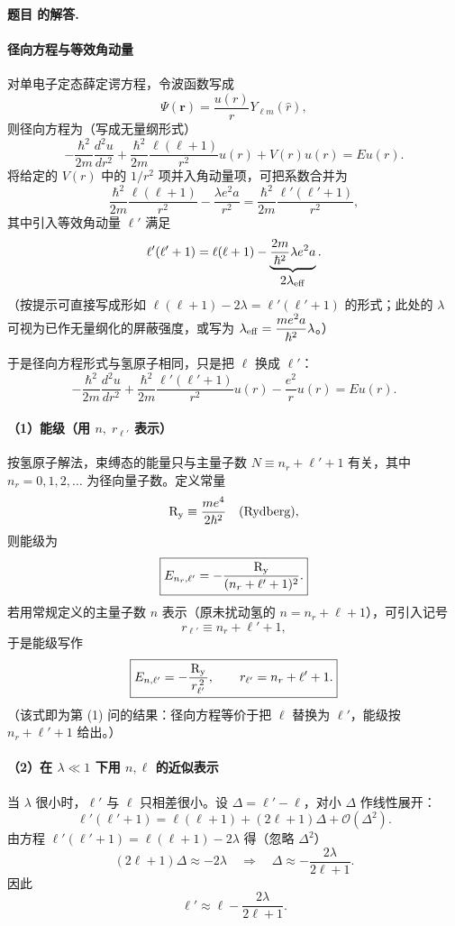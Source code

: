 \documentclass[12pt, a4paper, oneside]{ctexart}
\newcounter{problemname}
\newenvironment{solution}
  {\par\noindent\textbf{题目 \theproblemname 的解答. }}
  {\par}
\begin{document}
\begin{solution}
  \paragraph{径向方程与等效角动量}
对单电子定态薛定谔方程，令波函数写成
\[
\Psi(\mathbf r)=\frac{u(r)}{r}Y_{\ell m}(\hat r),
\]
则径向方程为（写成无量纲形式）
\[
-\frac{\hbar^2}{2m}\frac{d^2 u}{dr^2}
+\frac{\hbar^2}{2m}\frac{\ell(\ell+1)}{r^2}u(r)
+V(r)u(r)=Eu(r).
\]
将给定的 \(V(r)\) 中的 \(1/r^2\) 项并入角动量项，可把系数合并为
\[
\frac{\hbar^2}{2m}\frac{\ell(\ell+1)}{r^2}-\frac{\lambda e^2 a}{r^2}
=\frac{\hbar^2}{2m}\frac{\ell'(\ell'+1)}{r^2},
\]
其中引入等效角动量 \(\ell'\) 满足
\[
\ell'(\ell'+1)=\ell(\ell+1)-\underbrace{\frac{2m}{\hbar^2}\lambda e^2 a}_{\displaystyle 2\lambda_{\rm eff}}.
\]
（按提示可直接写成形如 \(\ell(\ell+1)-2\lambda=\ell'(\ell'+1)\) 的形式；此处的 \(\lambda\) 可视为已作无量纲化的屏蔽强度，或写为 \(\lambda_{\rm eff}=\dfrac{m e^2 a}{\hbar^2}\lambda\)。）

于是径向方程形式与氢原子相同，只是把 \(\ell\) 换成 \(\ell'\)：
\[
-\frac{\hbar^2}{2m}\frac{d^2 u}{dr^2}
+\frac{\hbar^2}{2m}\frac{\ell'(\ell'+1)}{r^2}u(r)
-\frac{e^2}{r}u(r)=Eu(r).
\]

\paragraph{（1）能级（用 \(n,\;r_{\ell'}\) 表示）}
按氢原子解法，束缚态的能量只与主量子数 \(N\equiv n_r+\ell'+1\) 有关，其中 \(n_r=0,1,2,\dots\) 为径向量子数。定义常量
\[
{\rm R_y}\equiv\frac{m e^4}{2\hbar^2}\quad(\text{Rydberg}),
\]
则能级为
\[
\boxed{E_{n_r,\ell'}=-\frac{{\rm R_y}}{(n_r+\ell'+1)^2}.}
\]
若用常规定义的主量子数 \(n\) 表示（原未扰动氢的 \(n=n_r+\ell+1\)），可引入记号
\[
r_{\ell'}\equiv n_r+\ell'+1,
\]
于是能级写作
\[
\boxed{E_{n,\ell'}=-\dfrac{{\rm R_y}}{\,r_{\ell'}^{\,2}\,},\qquad r_{\ell'}=n_r+\ell'+1.}
\]
（该式即为第 (1) 问的结果：径向方程等价于把 \(\ell\) 替换为 \(\ell'\)，能级按 \(n_r+\ell'+1\) 给出。）

\paragraph{（2）在 \(\lambda\ll1\) 下用 \(n,\ell\) 的近似表示}
当 \(\lambda\) 很小时，\(\ell'\) 与 \(\ell\) 只相差很小。设 \(\Delta=\ell'-\ell\)，对小 \(\Delta\) 作线性展开：
\[
\ell'(\ell'+1)=\ell(\ell+1)+(2\ell+1)\Delta+\mathcal O(\Delta^2).
\]
由方程 \(\ell'(\ell'+1)=\ell(\ell+1)-2\lambda\) 得（忽略 \(\Delta^2\)）
\[
(2\ell+1)\Delta\approx-2\lambda \quad\Longrightarrow\quad
\Delta\approx -\frac{2\lambda}{2\ell+1}.
\]
因此
\[
\ell'\approx \ell-\frac{2\lambda}{2\ell+1}.
\]


\end{solution}
\end{document}
